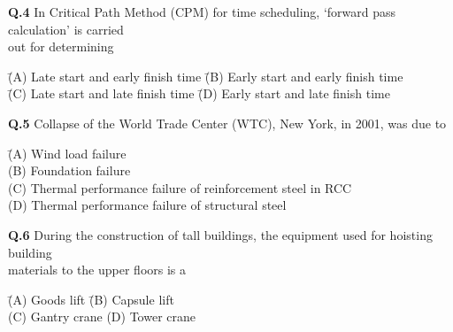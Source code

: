 \documentclass{article}
\begin{document}
\noindent\textbf{Q.4} \hspace{0.5cm} In Critical Path Method (CPM) for time scheduling, ‘forward pass calculation’ is carried \\
\hspace*{1.3cm} out for determining

\vspace{0.5em}

\begin{tabbing}
\hspace{2cm} \= (A) Late start and early finish time \hspace{2cm} \= (B) Early start and early finish time \\
\hspace{2cm} \= (C) Late start and late finish time \hspace{2.2cm} \= (D) Early start and late finish time
\end{tabbing}


\noindent\textbf{Q.5} \hspace{0.5em} Collapse of the World Trade Center (WTC), New York, in 2001, was due to

\vspace{0.5em}

\begin{tabbing}
\hspace{2cm} \= (A) Wind load failure \\
\> (B) Foundation failure \\
\> (C) Thermal performance failure of reinforcement steel in RCC \\
\> (D) Thermal performance failure of structural steel
\end{tabbing}

\vspace{1.5em}

\noindent\textbf{Q.6} \hspace{0.5em} During the construction of tall buildings, the equipment used for hoisting building\\
\hspace*{2.4em} materials to the upper floors is a

\vspace{0.5em}

\begin{tabbing}
\hspace{2cm} \= (A) Goods lift \hspace{3cm} \= (B) Capsule lift \\
\> (C) Gantry crane \> (D) Tower crane
\end{tabbing}
\end{document}
